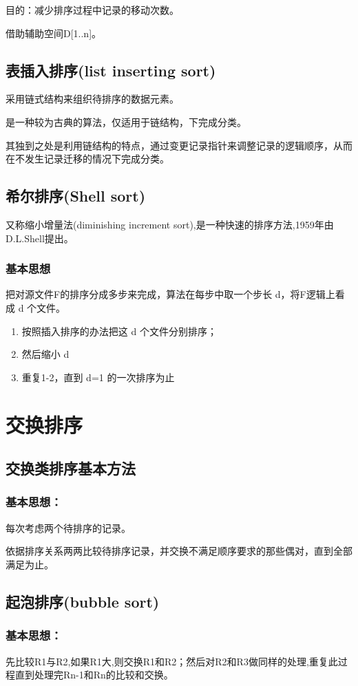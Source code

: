 \documentclass[AutoFakeBold]{LZUThesis2007}
\begin{document}
目的：减少排序过程中记录的移动次数。

借助辅助空间D[1..n]。

		\subsection{表插入排序(list inserting sort)}
采用链式结构来组织待排序的数据元素。        

是一种较为古典的算法，仅适用于链结构，下完成分类。

其独到之处是利用链结构的特点，通过变更记录指针来调整记录的逻辑顺序，从而在不发生记录迁移的情况下完成分类。
		\subsection{希尔排序(Shell  sort)}
         又称缩小增量法(diminishing increment sort),是一种快速的排序方法,1959年由D.L.Shell提出。
			\subsubsection{基本思想}
	把对源文件F的排序分成多步来完成，算法在每步中取一个步长 d，将F逻辑上看成 d 个文件。
\begin{enumerate}
	\item 按照插入排序的办法把这 d 个文件分别排序；
	\item 然后缩小 d 
	\item 重复1-2，直到 d=1 的一次排序为止
\end{enumerate}
	\section{交换排序}
		\subsection{交换类排序基本方法}
			\subsubsection{基本思想：}
每次考虑两个待排序的记录。

依据排序关系两两比较待排序记录，并交换不满足顺序要求的那些偶对，直到全部满足为止。

		\subsection{起泡排序(bubble sort)}
			\subsubsection{基本思想：}
先比较R1与R2,如果R1大,则交换R1和R2；然后对R2和R3做同样的处理,重复此过程直到处理完Rn-1和Rn的比较和交换。
\end{document}
